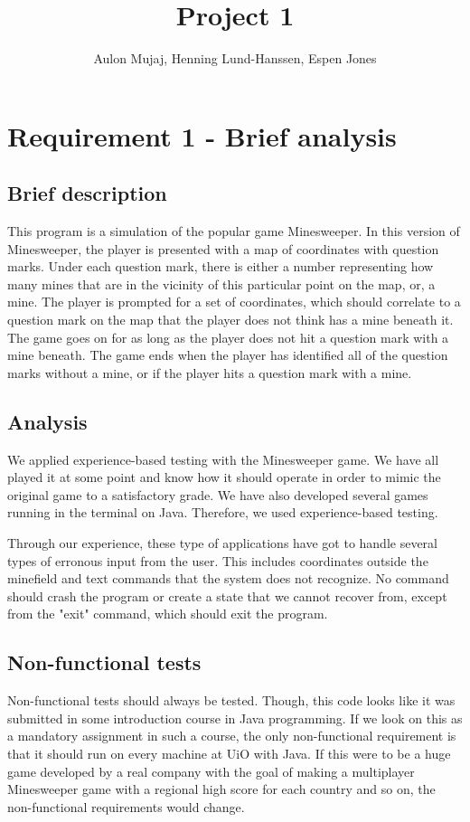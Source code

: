 \documentclass[UKenglish]{article}  %
\title{Project 1}        %
\author{Aulon Mujaj, Henning Lund-Hanssen, Espen Jones}                      %
\begin{document}
\maketitle{}

\section{Requirement 1 - Brief analysis}

\subsection{Brief description}
This program is a simulation of the popular game Minesweeper. In this version of
Minesweeper, the player is presented with a map of coordinates with
question marks. Under each question mark, there is either a number representing
how many mines that are in the vicinity of this particular point on the map, or,
a mine. The player is prompted for a set of coordinates, which should correlate
to a question mark on the map that the player does not think has a mine beneath
it. The game goes on for as long as the player does not hit a question mark with
a mine beneath. The game ends when the player has identified all of the
question marks without a mine, or if the player hits a question mark with a mine.

\subsection{Analysis}
We applied experience-based testing with the Minesweeper game. We have all
played it at some point and know how it should operate in order to mimic the
original game to a satisfactory grade. We have also developed several games
running in the terminal on Java. Therefore, we used experience-based testing.

Through our experience, these type of applications have got to handle several
types of erronous input from the user. This includes coordinates outside the
minefield and text commands that the system does not recognize. No command
should crash the program or create a state that we cannot recover from, except
from the "exit" command, which should exit the program.

\subsection{Non-functional tests}
Non-functional tests should always be tested. Though, this code looks like it
was submitted in some introduction course in Java programming. If we look on
this as a mandatory assignment in such a course, the only non-functional
requirement is that it should run on every machine at UiO with Java. If this
were to be a huge game developed by a real company with the goal of making a
multiplayer Minesweeper game with a regional high score for each country and so
on, the non-functional requirements would change.
\end{document}
